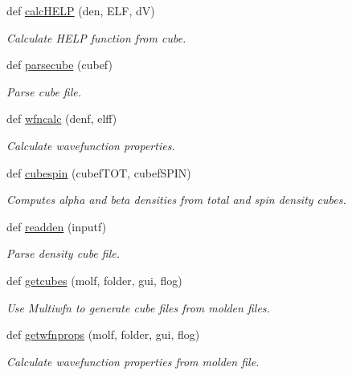\begin{DoxyCompactItemize}
def \hyperlink{namespacemolSimplify_1_1Scripts_1_1postmwfn_a6e704fa37983b620d0c1f0d6ea75eea9}{calc\+H\+E\+LP} (den, E\+LF, dV)
\begin{DoxyCompactList}\small\item\em Calculate H\+E\+LP function from cube. \end{DoxyCompactList}\item 
def \hyperlink{namespacemolSimplify_1_1Scripts_1_1postmwfn_ad7f5d65e9c9c97393c12e09adc84539d}{parsecube} (cubef)
\begin{DoxyCompactList}\small\item\em Parse cube file. \end{DoxyCompactList}\item 
def \hyperlink{namespacemolSimplify_1_1Scripts_1_1postmwfn_ae0537c78599271f79891ffab0b308ad0}{wfncalc} (denf, elff)
\begin{DoxyCompactList}\small\item\em Calculate wavefunction properties. \end{DoxyCompactList}\item 
def \hyperlink{namespacemolSimplify_1_1Scripts_1_1postmwfn_a56fde1195282f9d99cbc7c9b908c5fe4}{cubespin} (cubef\+T\+OT, cubef\+S\+P\+IN)
\begin{DoxyCompactList}\small\item\em Computes alpha and beta densities from total and spin density cubes. \end{DoxyCompactList}\item 
def \hyperlink{namespacemolSimplify_1_1Scripts_1_1postmwfn_a959558b8a0ce7ce7fcf7068235e5065b}{readden} (inputf)
\begin{DoxyCompactList}\small\item\em Parse density cube file. \end{DoxyCompactList}\item 
def \hyperlink{namespacemolSimplify_1_1Scripts_1_1postmwfn_a01eded6de9df25e9ce55630e36571684}{getcubes} (molf, folder, gui, flog)
\begin{DoxyCompactList}\small\item\em Use Multiwfn to generate cube files from molden files. \end{DoxyCompactList}\item 
def \hyperlink{namespacemolSimplify_1_1Scripts_1_1postmwfn_a716e70de36f0fca9b8f443d444417f7c}{getwfnprops} (molf, folder, gui, flog)
\begin{DoxyCompactList}\small\item\em Calculate wavefunction properties from molden file. \end{DoxyCompactList}\item 

\end{DoxyCompactItemize}
